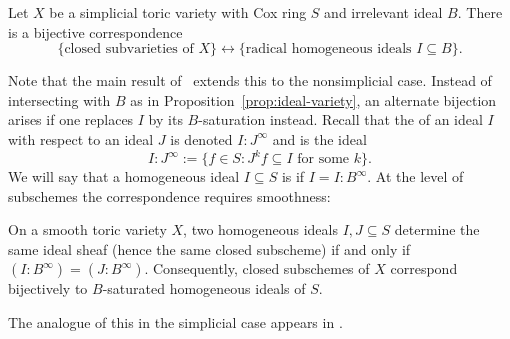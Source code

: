 \documentclass{amsart}
\begin{document}
\begin{prop}\label{prop:ideal-variety}
  Let $X$ be a simplicial toric variety with Cox ring $S$ and irrelevant ideal $B$. There is a bijective correspondence
  \[ \{\text{closed subvarieties of } X\} \longleftrightarrow \{\text{radical homogeneous ideals } I\subseteq B\}. \]
\end{prop}
Note that the main result of~\cite{BEF26} extends this to the nonsimplicial case.  Instead of intersecting with $B$ as in Proposition~\ref{prop:ideal-variety}, an alternate bijection arises if one replaces $I$ by its $B$-saturation instead.   Recall that the  of an ideal $I$ with respect to an ideal $J$ is denoted $I:J^\infty$ and is the ideal
\[
I:J^\infty := \{f\in S : J^k f\subseteq I \text{ for some } k\}.
\]
We will say that a homogeneous ideal $I\subseteq S$ is  if $I=I:B^\infty$.
At the level of subschemes the correspondence requires smoothness:

\begin{prop}\label{prop:ideal-sheaf}
  On a smooth toric variety $X$, two homogeneous ideals $I,J\subseteq S$ determine the same ideal sheaf (hence the same closed subscheme) if and only if $(I:B^\infty)=(J:B^\infty)$. Consequently, closed subschemes of $X$ correspond bijectively to $B$-saturated homogeneous ideals of $S$.
\end{prop}
The analogue of this in the simplicial case appears in \cite[Thm.~3.7]{Cox95}.
\end{document}
